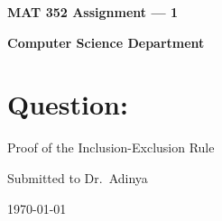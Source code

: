 \documentclass[a4paper]{article}
\begin{document}
    \begin{titlepage}

        \begin{center}
            \vspace*{1cm}

            \Huge
            \textbf{MAT 352 Assignment --- 1}

            \vspace{1.5cm}

            \textbf{Computer Science Department}

            \vspace{2cm}
            \normalsize
            \raggedright{
                \section*{Question:}
                Proof of the Inclusion-Exclusion Rule
            }

            \vspace{5cm}
            \centering
            Submitted to Dr.\ Adinya

            \vspace{1cm}
            \today
        \end{center}

    \end{titlepage}

	\pagestyle{fancy}
	\fancyhead{}
\end{document}
